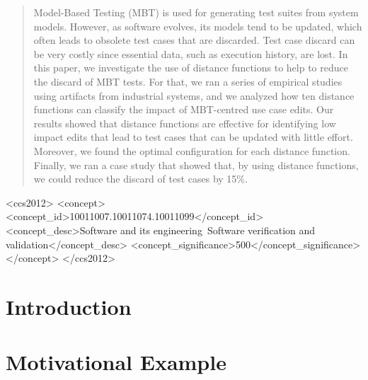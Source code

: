 \documentclass[sigconf]{acmart}
\begin{document}
%
\begin{abstract}
Model-Based Testing (MBT) is used for generating test suites from system models. However, as software evolves, its models tend to be updated, which often leads to obsolete test cases that are discarded. Test case discard can be very costly since essential data, such as execution history, are lost. In this paper, we investigate the use of distance functions to help to reduce the discard of MBT tests. For that, we ran a series of empirical studies using artifacts from industrial systems, and we analyzed how ten distance functions can classify the impact of MBT-centred use case edits. Our results showed that distance functions are effective for identifying low impact edits that lead to test cases that can be updated with little effort. Moreover, we found the optimal configuration for each distance function. Finally, we ran a case study that showed that, by using distance functions, we could reduce the discard of test cases by 15\%.  
\end{abstract}

%
%
\begin{CCSXML}
<ccs2012>
<concept>
<concept_id>10011007.10011074.10011099</concept_id>
<concept_desc>Software and its engineering~Software verification and validation</concept_desc>
<concept_significance>500</concept_significance>
</concept>
</ccs2012>
\end{CCSXML}



\maketitle
\section{Introduction}


\section{Motivational Example} \label{sec:motiv}

\end{document}
